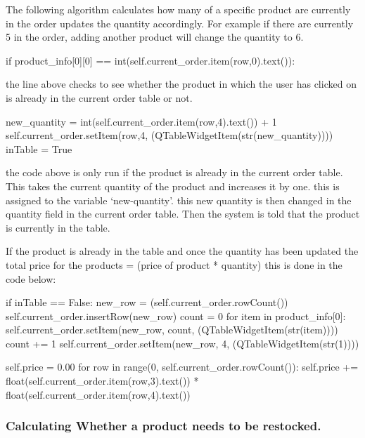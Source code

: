 The following algorithm calculates how many of a specific product are currently in the order updates the quantity accordingly. For example if there are currently 5 in the order, adding another product will change the quantity to 6.


\begin{python}
if product_info[0][0] == int(self.current_order.item(row,0).text()):
\end{python}

the line above checks to see whether the product in which the user has clicked on is already in the current order table or not.

\begin{python}
new_quantity = int(self.current_order.item(row,4).text()) + 1
self.current_order.setItem(row,4, (QTableWidgetItem(str(new_quantity))))
inTable  = True
\end{python}

the code above is only run if the product is already in the current order table. This takes the current quantity of the product and increases it by one. this is assigned to the variable `new-quantity'. this new quantity is then changed in the quantity field in the current order table. Then the system is told that the product is currently in the table.

If the product is already in the table and once the quantity has been updated the total price for the products = (price of product * quantity) this is done in the code below:

\begin{python}
if inTable == False:
            new_row = (self.current_order.rowCount())
            self.current_order.insertRow(new_row)
            count = 0
            for item in product_info[0]:
                self.current_order.setItem(new_row, count, (QTableWidgetItem(str(item))))
                count += 1
            self.current_order.setItem(new_row, 4, (QTableWidgetItem(str(1))))

        self.price = 0.00
        for row in range(0, self.current_order.rowCount()):
            self.price += float(self.current_order.item(row,3).text()) * float(self.current_order.item(row,4).text())
\end{python}

\pagebreak

\subsubsection{Calculating Whether a product needs to be restocked.}

